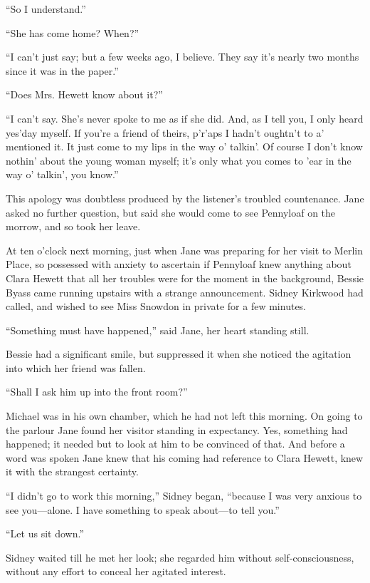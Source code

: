 ``So I understand.''

``She has come home? When?''

``I can't just say; but a few weeks ago, I believe. They say it's nearly
two months since it was in the paper.''

``Does Mrs. Hewett know about it?''

``I can't say. She's never spoke to me as if she did. And, as I tell
you, I only heard yes'day myself. If you're a friend of theirs, p'r'aps
I hadn't oughtn't to a' mentioned it. It just come to my lips in the way
o' talkin'. Of course I don't know nothin' about the young woman myself;
it's only what you comes to 'ear in the way o' talkin', you know.''

This apology was doubtless produced by the listener's troubled
countenance. Jane asked no further question, but said she would come to
see Pennyloaf on the morrow, and so took her leave.

{\protect\hypertarget{148}{}{}}At ten o'clock next morning, just when
Jane was preparing for her visit to Merlin Place, so possessed with
anxiety to ascertain if Pennyloaf knew anything about Clara Hewett that
all her troubles were for the moment in the background, Bessie Byass
came running upstairs with a strange announcement. Sidney Kirkwood had
called, and wished to see Miss Snowdon in private for a few minutes.

``Something must have happened,'' said Jane, her heart standing still.

Bessie had a significant smile, but suppressed it when she noticed the
agitation into which her friend was fallen.

``Shall I ask him up into the front room?''

Michael was in his own chamber, which he had not left this morning. On
going to the parlour Jane found her visitor standing in expectancy. Yes,
something had happened; it needed but to look at him to be convinced of
that. And before a word was spoken Jane knew that his coming had
reference to Clara Hewett, knew it with the strangest certainty.

``I didn't go to work this morning,'' Sidney began, ``because I was very
anxious to see {\protect\hypertarget{149}{}{}}you---alone. I have
something to speak about---to tell you.''

``Let us sit down.''

Sidney waited till he met her look; she regarded him without
self-consciousness, without any effort to conceal her agitated interest.

